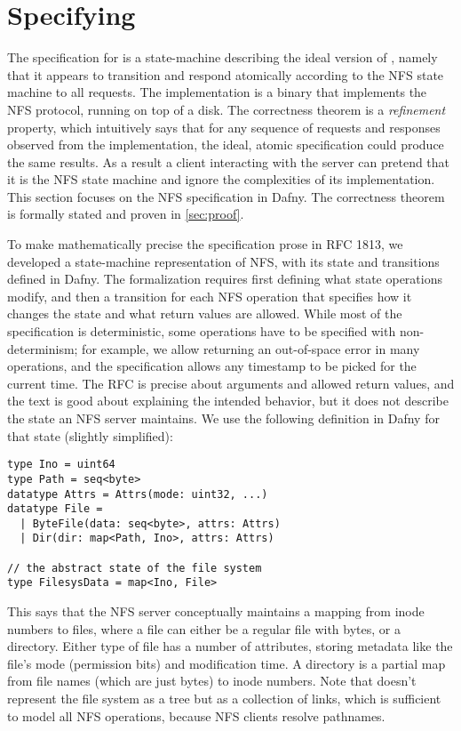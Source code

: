 \section{Specifying \sys}%
\label{sec:soundness}

The specification for \sys is a state-machine describing the ideal
version of \sys, namely that it appears to transition and respond
atomically according to the NFS state machine to all requests. The
implementation is a binary  that implements the NFS
protocol, running on top of a
disk. The \sys correctness
theorem is a \emph{refinement} property, which intuitively says that
for any sequence of requests and responses observed from the
implementation, the ideal, atomic specification could produce the same
results. As a result a client interacting with the server can pretend
that it is the NFS state machine and ignore the complexities of its
implementation.  This section focuses on the NFS specification in
Dafny.  The correctness theorem is formally stated and proven in
\autoref{sec:proof}.

To make mathematically precise the specification prose in RFC 1813, we
developed a state-machine representation of NFS, with its state and
transitions defined in Dafny. The formalization requires first
defining what state operations modify, and then a transition for each
NFS operation that specifies how it changes the state and what return
values are allowed. While most of the specification is deterministic,
some operations have to be specified with non-determinism; for
example, we allow returning an out-of-space error in many operations,
and the specification allows any timestamp to be picked for the
current time. The RFC is precise about arguments and allowed return
values, and the text is good about explaining the intended behavior,
but it does not describe the state an NFS server maintains. We use the
following definition in Dafny for that state (slightly simplified):

\begin{verbatim}
type Ino = uint64
type Path = seq<byte>
datatype Attrs = Attrs(mode: uint32, ...)
datatype File =
  | ByteFile(data: seq<byte>, attrs: Attrs)
  | Dir(dir: map<Path, Ino>, attrs: Attrs)

// the abstract state of the file system
type FilesysData = map<Ino, File>
\end{verbatim}

This says that the NFS server conceptually maintains a mapping from
inode numbers to files, where a file can either be a regular file with
bytes, or a directory. Either type of file has a number of attributes, storing
metadata like the file's mode (permission bits) and modification time. A
directory is a partial map from file names
(which are just bytes) to inode numbers. Note that \sys doesn't
represent the file system as a tree but as a collection of
links, which is sufficient to model all NFS operations, because
NFS clients resolve pathnames.

